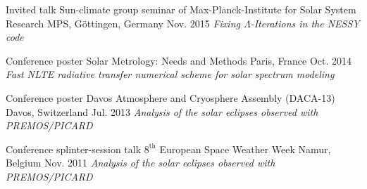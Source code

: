 

\begin{cventries}

  \cventry
    {Invited talk} %
    {Sun-climate group seminar of Max-Planck-Institute for Solar System Research} %
    {MPS, G{\"o}ttingen, Germany} %
    {Nov. 2015} %
    {\textit{Fixing $\Lambda$-Iterations in the NESSY code}} %

  \cventry
    {Conference poster} %
    {Solar Metrology: Needs and Methods} %
    {Paris, France} %
    {Oct. 2014} %
    {\textit{Fast NLTE radiative transfer numerical scheme for solar spectrum modeling}} %

  \cventry
    {Conference poster} %
    {Davos Atmosphere and Cryosphere Assembly (DACA-13)} %
    {Davos, Switzerland} %
    {Jul. 2013} %
    {\textit{Analysis of the solar eclipses observed with PREMOS/PICARD}} %

  \cventry
    {Conference splinter-session talk} %
    {$8^\mathrm{th}$ European Space Weather Week} %
    {Namur, Belgium} %
    {Nov. 2011} %
    {\textit{Analysis of the solar eclipses observed with PREMOS/PICARD}} %

\end{cventries}
